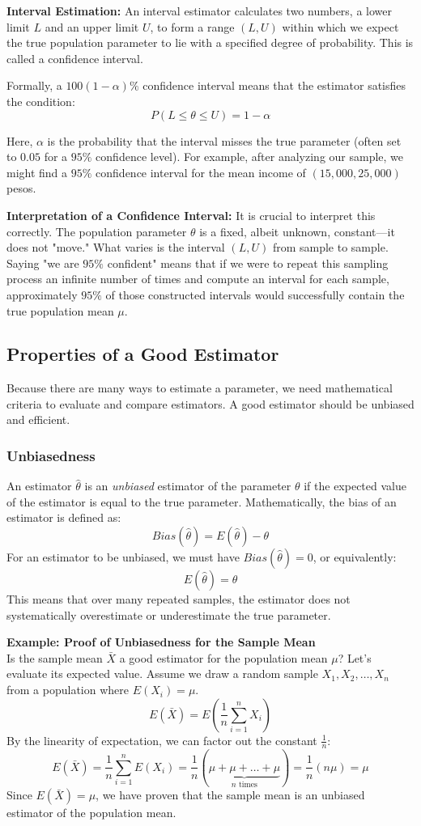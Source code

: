 \documentclass{article}
\begin{document}
\textbf{Interval Estimation:}
An interval estimator calculates two numbers, a lower limit $L$ and an upper limit $U$, to form a range $(L, U)$ within which we expect the true population parameter to lie with a specified degree of probability. This is called a confidence interval. 

Formally, a $100(1-\alpha)\%$ confidence interval means that the estimator satisfies the condition:
$$ P(L \le \theta \le U) = 1 - \alpha $$

Here, $\alpha$ is the probability that the interval misses the true parameter (often set to $0.05$ for a $95\%$ confidence level). For example, after analyzing our sample, we might find a $95\%$ confidence interval for the mean income of $(15,000, 25,000)$ pesos. 

\textbf{Interpretation of a Confidence Interval:}
It is crucial to interpret this correctly. The population parameter $\theta$ is a fixed, albeit unknown, constant—it does not "move." What varies is the interval $(L, U)$ from sample to sample. Saying "we are $95\%$ confident" means that if we were to repeat this sampling process an infinite number of times and compute an interval for each sample, approximately $95\%$ of those constructed intervals would successfully contain the true population mean $\mu$.

\subsection{Properties of a Good Estimator}

Because there are many ways to estimate a parameter, we need mathematical criteria to evaluate and compare estimators. A good estimator should be unbiased and efficient.

\subsubsection{Unbiasedness}
An estimator $\hat{\theta}$ is an \emph{unbiased} estimator of the parameter $\theta$ if the expected value of the estimator is equal to the true parameter. Mathematically, the bias of an estimator is defined as:
$$ Bias(\hat{\theta}) = E(\hat{\theta}) - \theta $$
For an estimator to be unbiased, we must have $Bias(\hat{\theta}) = 0$, or equivalently:
$$ E(\hat{\theta}) = \theta $$
This means that over many repeated samples, the estimator does not systematically overestimate or underestimate the true parameter.

\textbf{Example: Proof of Unbiasedness for the Sample Mean} \\
Is the sample mean $\bar{X}$ a good estimator for the population mean $\mu$? Let's evaluate its expected value. Assume we draw a random sample $X_1, X_2, \dots, X_n$ from a population where $E(X_i) = \mu$.
$$ E(\bar{X}) = E\left( \frac{1}{n} \sum_{i=1}^{n} X_i \right) $$
By the linearity of expectation, we can factor out the constant $\frac{1}{n}$:
$$ E(\bar{X}) = \frac{1}{n} \sum_{i=1}^{n} E(X_i) = \frac{1}{n} (\underbrace{\mu + \mu + \dots + \mu}_{n \text{ times}}) = \frac{1}{n} (n\mu) = \mu $$
Since $E(\bar{X}) = \mu$, we have proven that the sample mean is an unbiased estimator of the population mean.
\end{document}
